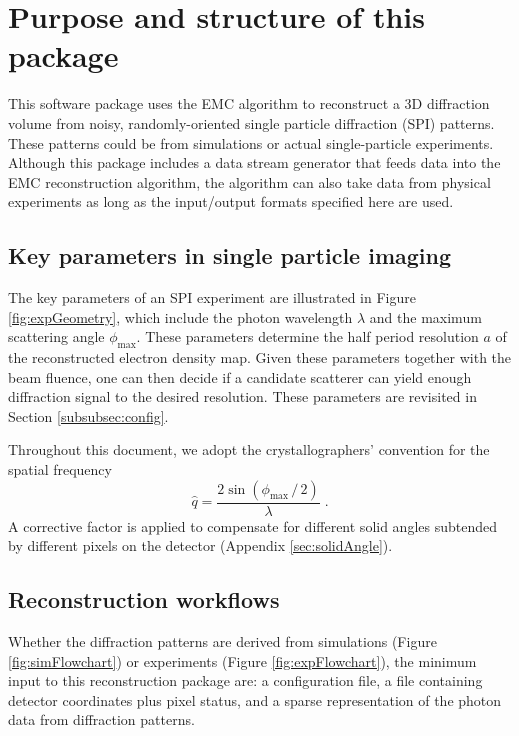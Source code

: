 \documentclass[]{iucr}              %
\begin{document}

\section{Purpose and structure of this package}\label{sec:package}

This software package uses the EMC algorithm to reconstruct a 3D diffraction volume from noisy, randomly-oriented single particle diffraction (SPI) patterns. These patterns could be from simulations or actual single-particle experiments. Although this package includes a data stream generator that feeds data into the EMC reconstruction algorithm, the algorithm can also take data from physical experiments as long as the input/output formats specified here are used.

\subsection{Key parameters in single particle imaging}\label{sec:expParams}

The key parameters of an SPI experiment are illustrated in Figure \ref{fig:expGeometry}, which include the photon wavelength $\lambda$ and the maximum scattering angle $\phi_{\text{max}}$. These parameters determine the half period resolution $a$ of the reconstructed electron density map. Given these parameters together with the beam fluence, one can then decide if a candidate scatterer can yield enough diffraction signal to the desired resolution. These parameters are revisited in Section \ref{subsubsec:config}.

Throughout this document, we adopt the crystallographers' convention for the spatial frequency 
\begin{equation}
\widehat{q} = \frac{2 \sin(\phi_{\text{max}}\,/\,2)}{\lambda}\;.
\end{equation}
A corrective factor is applied to compensate for different solid angles subtended by different pixels on the detector (Appendix \ref{sec:solidAngle}). 

\subsection{Reconstruction workflows}\label{sec:dataStreamSim}

Whether the diffraction patterns are derived from simulations (Figure \ref{fig:simFlowchart}) or experiments (Figure \ref{fig:expFlowchart}), the minimum input to this reconstruction package are: a configuration file, a file containing detector coordinates plus pixel status, and a sparse representation of the photon data from diffraction patterns. 
\end{document}
